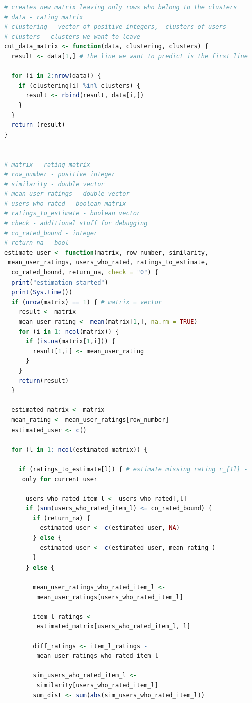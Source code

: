 \documentclass[a4paper, 12pt]{article} %
\begin{document}
\begin{lstlisting}[language=R]
# creates new matrix leaving only rows who belong to the clusters
# data - rating matrix
# clustering - vector of positive integers,  clusters of users
# clusters - clusters we want to leave
cut_data_matrix <- function(data, clustering, clusters) { 
  result <- data[1,] # the line we want to predict is the first line
  
  for (i in 2:nrow(data)) {
    if (clustering[i] %in% clusters) { 
      result <- rbind(result, data[i,])
    }
  }
  return (result)
}


# matrix - rating matrix
# row_number - positive integer
# similarity - double vector
# mean_user_ratings - double vector
# users_who_rated - boolean matrix
# ratings_to_estimate - boolean vector
# check - additional stuff for debugging
# co_rated_bound - integer
# return_na - bool
estimate_user <- function(matrix, row_number, similarity,
 mean_user_ratings, users_who_rated, ratings_to_estimate,
  co_rated_bound, return_na, check = "0") { 
  print("estimation started")
  print(Sys.time())
  if (nrow(matrix) == 1) { # matrix = vector 
    result <- matrix
    mean_user_rating <- mean(matrix[1,], na.rm = TRUE)
    for (i in 1: ncol(matrix)) {
      if (is.na(matrix[1,i])) {
        result[1,i] <- mean_user_rating
      }
    }
    return(result)
  } 
  
  estimated_matrix <- matrix
  mean_rating <- mean_user_ratings[row_number]
  estimated_user <- c()

  for (l in 1: ncol(estimated_matrix)) {  

    if (ratings_to_estimate[l]) { # estimate missing rating r_{1l} -
     only for current user
      
      users_who_rated_item_l <- users_who_rated[,l] 
      if (sum(users_who_rated_item_l) <= co_rated_bound) {
        if (return_na) { 
          estimated_user <- c(estimated_user, NA)
        } else {
          estimated_user <- c(estimated_user, mean_rating )
        }
      } else {

        mean_user_ratings_who_rated_item_l <-
         mean_user_ratings[users_who_rated_item_l] 

        item_l_ratings <-
         estimated_matrix[users_who_rated_item_l, l]  
 
        diff_ratings <- item_l_ratings -
         mean_user_ratings_who_rated_item_l
 
        sim_users_who_rated_item_l <-
         similarity[users_who_rated_item_l]
        sum_dist <- sum(abs(sim_users_who_rated_item_l)) 
        

\end{lstlisting}
\end{document}
